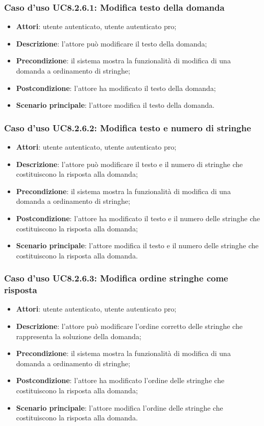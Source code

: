 \subsubsection{Caso d'uso UC8.2.6.1: Modifica testo della domanda}
\begin{itemize}
	\item \textbf{Attori}: utente autenticato, utente autenticato pro;
	\item \textbf{Descrizione}: l'attore può modificare il testo della domanda;
	\item \textbf{Precondizione}:  il sistema mostra la funzionalità di modifica di una domanda a ordinamento di stringhe; 
	\item \textbf{Postcondizione}: l'attore ha modificato il testo della domanda;
	\item \textbf{Scenario principale}: l'attore modifica il testo della domanda.
\end{itemize}

\subsubsection{Caso d'uso UC8.2.6.2: Modifica testo e numero di stringhe}
\begin{itemize}
	\item \textbf{Attori}: utente autenticato, utente autenticato pro;
	\item \textbf{Descrizione}: l'attore può modificare il testo e il numero di stringhe che costituiscono la risposta alla domanda;
	\item \textbf{Precondizione}:  il sistema mostra la funzionalità di modifica di una domanda a ordinamento di stringhe;
	\item \textbf{Postcondizione}: l'attore ha modificato il testo e il numero delle stringhe che costituiscono la risposta alla domanda;
	\item \textbf{Scenario principale}: l'attore modifica il testo e il numero delle stringhe che costituiscono la risposta alla domanda.
\end{itemize}

\subsubsection{Caso d'uso UC8.2.6.3: Modifica ordine stringhe come risposta}
\begin{itemize}
	\item \textbf{Attori}: utente autenticato, utente autenticato pro;
	\item \textbf{Descrizione}: l'attore può modificare l'ordine corretto delle stringhe che rappresenta la soluzione della domanda;
	\item \textbf{Precondizione}:  il sistema mostra la funzionalità di modifica di una domanda a ordinamento di stringhe; 
	\item \textbf{Postcondizione}: l'attore ha modificato l'ordine delle stringhe che costituiscono la risposta alla domanda;
	\item \textbf{Scenario principale}: l'attore modifica l'ordine delle stringhe che costituiscono la risposta alla domanda.
\end{itemize}
